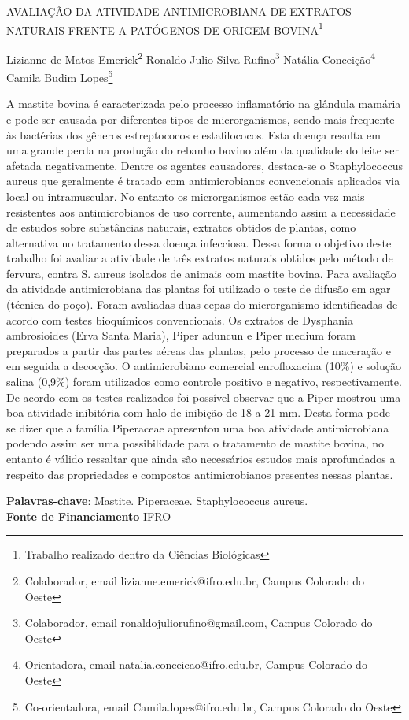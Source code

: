 \documentclass[article,12pt,onesidea,4paper,english,brazil]{abntex2}
\begin{document}
	
	
	\frenchspacing 
	
	\begin{center}
		\LARGE AVALIAÇÃO DA ATIVIDADE ANTIMICROBIANA DE EXTRATOS NATURAIS FRENTE A PATÓGENOS DE ORIGEM BOVINA\footnote{Trabalho realizado dentro da Ciências Biológicas}
		
		\normalsize
		Lizianne de Matos Emerick\footnote{Colaborador, email lizianne.emerick@ifro.edu.br, Campus Colorado do Oeste} 
		Ronaldo Julio Silva Rufino\footnote{Colaborador, email ronaldojuliorufino@gmail.com, Campus Colorado do Oeste} 
		Natália Conceição\footnote{Orientadora, email natalia.conceicao@ifro.edu.br, Campus Colorado do Oeste} 
	Camila Budim Lopes\footnote{Co-orientadora, email Camila.lopes@ifro.edu.br, Campus Colorado do Oeste} 
	\end{center}
	
	\noindent A mastite bovina é caracterizada pelo processo inflamatório na glândula mamária e pode ser causada por diferentes tipos de microrganismos, sendo mais frequente às bactérias dos gêneros estreptococos e estafilococos. Esta doença resulta em uma grande perda na produção do rebanho bovino além da qualidade do leite ser afetada negativamente. Dentre os agentes causadores, destaca-se o Staphylococcus aureus que geralmente é tratado com antimicrobianos convencionais aplicados via local ou intramuscular. No entanto os microrganismos estão cada vez mais resistentes aos antimicrobianos de uso corrente, aumentando assim a necessidade de estudos sobre substâncias naturais, extratos obtidos de plantas, como alternativa no tratamento dessa doença infecciosa. Dessa forma o objetivo deste trabalho foi avaliar a atividade de três extratos naturais obtidos pelo método de fervura, contra S. aureus isolados de animais com mastite bovina. Para avaliação da atividade antimicrobiana das plantas foi utilizado o teste de difusão em agar (técnica do poço). Foram avaliadas duas cepas do microrganismo identificadas de acordo com testes bioquímicos convencionais. Os extratos de Dysphania ambrosioides (Erva Santa Maria), Piper aduncun e Piper medium foram preparados a partir das partes aéreas das plantas, pelo processo de maceração e em seguida a decocção. O antimicrobiano comercial enrofloxacina (10\%) e solução salina (0,9\%) foram utilizados como controle positivo e negativo, respectivamente. De acordo com os testes realizados foi possível observar que a Piper mostrou uma boa atividade inibitória com halo de inibição de 18 a 21 mm. Desta forma pode-se dizer que a família Piperaceae apresentou uma boa atividade antimicrobiana podendo assim ser uma possibilidade para o tratamento de mastite bovina, no entanto é válido ressaltar que ainda são necessários estudos mais aprofundados a respeito das propriedades e compostos antimicrobianos presentes nessas plantas.
	
	\vspace{\onelineskip}
	
	\noindent
	\textbf{Palavras-chave}: Mastite. Piperaceae. Staphylococcus aureus. \\
	\textbf{Fonte de Financiamento} IFRO 
	
\end{document}
